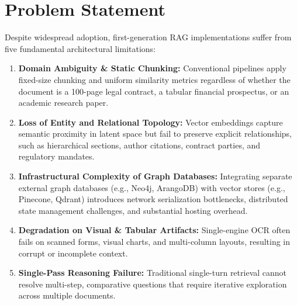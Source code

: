 \documentclass[12pt,a4paper,oneside]{report}
\begin{document}
\section{Problem Statement}
Despite widespread adoption, first-generation RAG implementations suffer from five fundamental architectural limitations:
\begin{enumerate}[itemsep=3pt]
    \item \textbf{Domain Ambiguity \& Static Chunking:} Conventional pipelines apply fixed-size chunking and uniform similarity metrics regardless of whether the document is a 100-page legal contract, a tabular financial prospectus, or an academic research paper.
    \item \textbf{Loss of Entity and Relational Topology:} Vector embeddings capture semantic proximity in latent space but fail to preserve explicit relationships, such as hierarchical sections, author citations, contract parties, and regulatory mandates.
    \item \textbf{Infrastructural Complexity of Graph Databases:} Integrating separate external graph databases (e.g., Neo4j, ArangoDB) with vector stores (e.g., Pinecone, Qdrant) introduces network serialization bottlenecks, distributed state management challenges, and substantial hosting overhead.
    \item \textbf{Degradation on Visual \& Tabular Artifacts:} Single-engine OCR often fails on scanned forms, visual charts, and multi-column layouts, resulting in corrupt or incomplete context.
    \item \textbf{Single-Pass Reasoning Failure:} Traditional single-turn retrieval cannot resolve multi-step, comparative questions that require iterative exploration across multiple documents.
\end{enumerate}
\end{document}
